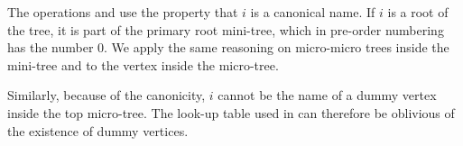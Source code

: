 \begin{algorithm}
\begin{algorithmic}
	 
		 
			\State {}
		\Else {}
			\State {}
		\EndIf
	\Else {}
		\State {}
	\EndIf
\EndFunction
\end{algorithmic}
\end{algorithm}

\begin{algorithm}
\begin{algorithmic}
	 
		\State {}
	\Else
		 
			\State {}
		\Else {}
			\State {}
		\EndIf
	\EndIf
\EndFunction
\end{algorithmic}
\end{algorithm}

\bigbreak

The operations \isRoot{} and \isLeaf{} use the property that $i$ is a canonical name.
If $i$ is a root of the tree, it is part of the primary root mini-tree, which in pre-order numbering has the number $0$.
We apply the same reasoning on micro-micro trees inside the mini-tree and to the vertex inside the micro-tree.

Similarly, because of the canonicity, $i$ cannot be the name of a dummy vertex inside the top micro-tree.
The \degree{} look-up table used in \isLeaf{} can therefore be oblivious of the existence of dummy vertices.

\begin{algorithm}
\begin{algorithmic}
	\State {}
\EndFunction
\end{algorithmic}
\end{algorithm}

\begin{algorithm}
\begin{algorithmic}
	\State {}
\EndFunction
\end{algorithmic}
\end{algorithm}

